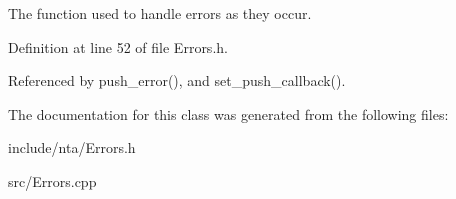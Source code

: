 The function used to handle errors as they occur. 



Definition at line 52 of file Errors.\+h.



Referenced by push\+\_\+error(), and set\+\_\+push\+\_\+callback().



The documentation for this class was generated from the following files\+:\begin{DoxyCompactItemize}
\item 
include/nta/Errors.\+h\item 
src/Errors.\+cpp\end{DoxyCompactItemize}

